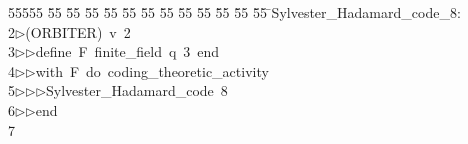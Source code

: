 %
%
\begin{tabbing}
55555 \= 55 \= 55 \= 55 \= 55 \= 55 \= 55 \= 55 \= 55 \= 55 \= 55 \= 55 \= 55 \= \>Sylvester\_Hadamard\_code\_8:\\[0pt]
2\>$\triangleright$\>(ORBITER)\ v\ 2\ \\[0pt]
3\>$\triangleright$\>$\triangleright$\>define\ F\ finite\_field\ q\ 3\ end\ \\[0pt]
4\>$\triangleright$\>$\triangleright$\>with\ F\ do\ coding\_theoretic\_activity\ \\[0pt]
5\>$\triangleright$\>$\triangleright$\>$\triangleright$\>Sylvester\_Hadamard\_code\ 8\ \\[0pt]
6\>$\triangleright$\>$\triangleright$\>end\\[0pt]
7\>\end{tabbing}
